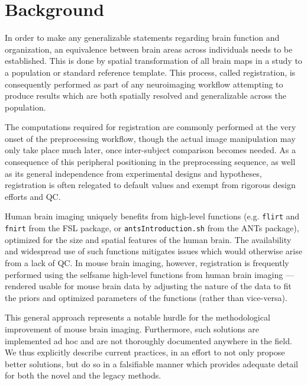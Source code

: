 \section{Background}
\label{sec:bg}

In order to make any generalizable statements regarding brain function and organization, an equivalence between brain areas across individuals needs to be established.
This is done by spatial transformation of all brain maps in a study to a population or standard reference template.
This process, called registration, is consequently performed as part of any neuroimaging workflow attempting to produce results which are both spatially resolved and generalizable across the population.

The computations required for registration are commonly performed at the very onset of the preprocessing workflow,
though the actual image manipulation may only take place much later, once inter-subject comparison becomes needed.
As a consequence of this peripheral positioning in the preprocessing sequence, as well as its general independence from experimental designs and hypotheses, registration is often relegated to default values and exempt from rigorous design efforts and QC.

Human brain imaging uniquely benefits from high-level functions (e.g. \textcolor{mg}{\texttt{flirt}} and  \textcolor{mg}{\texttt{fnirt}} from the FSL package\cite{fsl}, or \textcolor{mg}{\texttt{antsIntroduction.sh}} from the ANTs package\cite{ants}), optimized for the size and spatial features of the human brain.
The availability and widespread use of such functions mitigates issues which would otherwise arise from a lack of QC.
In mouse brain imaging, however, registration is frequently performed using the selfsame high-level functions from human brain imaging --- rendered usable for mouse brain data by adjusting the nature of the data to fit the priors and optimized parameters of the functions (rather than vice-versa).

This general approach represents a notable hurdle for the methodological improvement of mouse brain imaging.
Furthermore, such solutions are implemented ad hoc and are not thoroughly documented anywhere in the field.
We thus explicitly describe current practices, in an effort to not only propose better solutions, but do so in a falsifiable manner which provides adequate detail for both the novel and the legacy methods.

